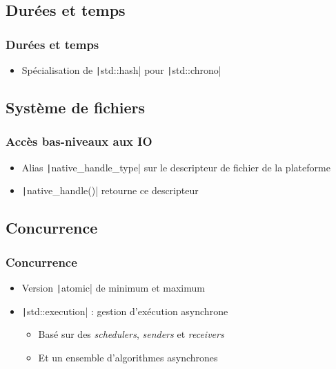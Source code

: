 \documentclass[C++.tex]{subfiles}
\begin{document}
\subsection*{Durées et temps}
\begin{frame}[fragile]
	\frametitle{Durées et temps}
	\begin{itemize}
		\item Spécialisation de \texttt|std::hash| pour \texttt|std::chrono|
	\end{itemize}

\end{frame}

\subsection*{Système de fichiers}
\begin{frame}[fragile]
	\frametitle{Accès bas-niveaux aux IO}
	\begin{itemize}
		\item Alias \texttt|native_handle_type| sur le descripteur de fichier de la plateforme
		\item \texttt|native_handle()| retourne ce descripteur
	\end{itemize}

\end{frame}

\subsection*{Concurrence}
\begin{frame}[fragile]
	\frametitle{Concurrence}
	\begin{itemize}
		\item Version \texttt|atomic| de minimum et maximum
		\item \texttt|std::execution| : gestion d'exécution asynchrone
		\begin{itemize}
			\item Basé sur des \textit{schedulers}, \textit{senders} et \textit{receivers}
			\item Et un ensemble d'algorithmes asynchrones
		\end{itemize}
	\end{itemize}

\end{frame}
\end{document}
